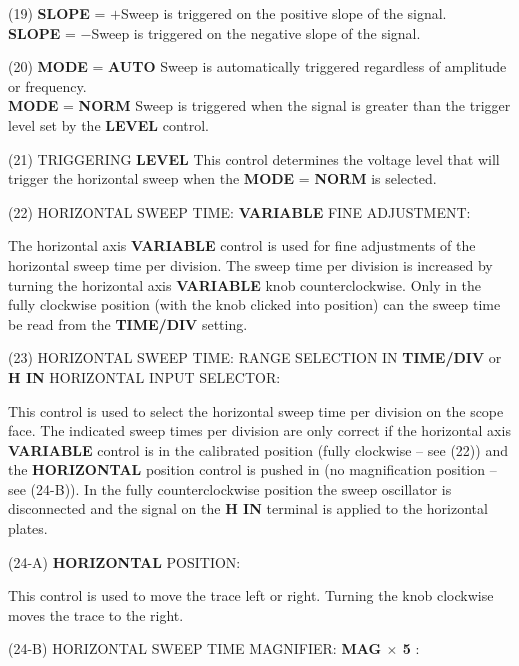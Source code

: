 \indent \indent (19) \textbf{SLOPE} = $+$Sweep is triggered on the positive slope of the signal.\\
\indent \indent \hspace{1cm}\textbf{SLOPE} = $-$Sweep is triggered on the negative slope of the signal.\myskip

\indent\indent (20) \textbf{MODE} = \textbf{AUTO} Sweep is automatically triggered regardless of amplitude or frequency.\\
\indent\indent \hspace{1cm} \textbf{MODE} = \textbf{NORM} Sweep is triggered when the signal is greater than the trigger level set by the \textbf{LEVEL} control. \myskip

\indent \indent (21) TRIGGERING \textbf{LEVEL} This control determines the voltage level that will trigger the horizontal sweep when the \textbf{MODE} = \textbf{NORM} is selected.\myskip

\indent (22) HORIZONTAL SWEEP TIME: \textbf{VARIABLE} FINE ADJUSTMENT:\myskip

\indent \indent The horizontal axis \textbf{VARIABLE} control is used for fine adjustments of the horizontal sweep time per division. The sweep time per division is increased by turning the horizontal axis \textbf{VARIABLE} knob counterclockwise. Only in the fully clockwise position (with the knob clicked into position) can the sweep time be read from the \textbf{TIME/DIV} setting. \myskip

\indent (23) HORIZONTAL SWEEP TIME: RANGE SELECTION IN \textbf{TIME/DIV} or \textbf{H IN} HORIZONTAL INPUT SELECTOR:\myskip

\indent \indent This control is used to select the horizontal sweep time per division on the scope face. The indicated sweep times per division are only correct if the horizontal axis \textbf{VARIABLE} control is in the calibrated position (fully clockwise -- see (22)) and the \textbf{HORIZONTAL} position control is pushed in (no magnification position -- see (24-B)). In the fully counterclockwise position the sweep oscillator is disconnected and the signal on the \textbf{H IN} terminal is applied to the horizontal plates.\myskip

\indent (24-A) \textbf{HORIZONTAL} POSITION:\myskip

\indent \indent This control is used to move the trace left or right. Turning the knob clockwise moves the trace to the right.\myskip

\indent (24-B) HORIZONTAL SWEEP TIME MAGNIFIER: \textbf{MAG $\times$ 5} :\myskip

